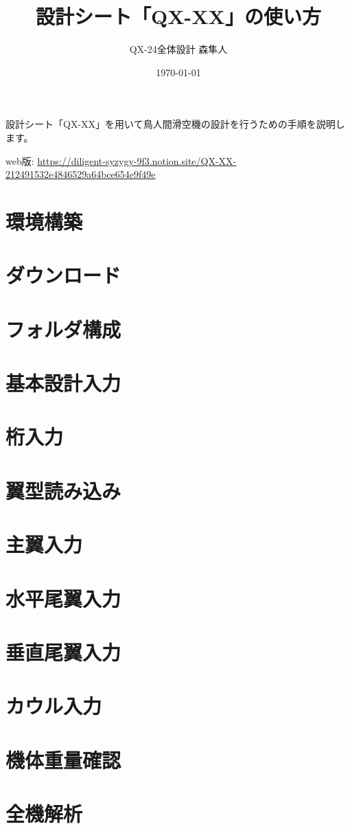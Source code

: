 \documentclass[a4paper,11pt,uplatex]{jsarticle}
\begin{document}
\title{設計シート「QX-XX」の使い方}
\author{QX-24全体設計 森隼人}
\date{\today}
\maketitle

設計シート「QX-XX」を用いて鳥人間滑空機の設計を行うための手順を説明します。

web版: 
\url{https://diligent-syzygy-9f3.notion.site/QX-XX-212491532e4846529a64bce654e9f49e}

\tableofcontents

\section{環境構築}
\section{ダウンロード}
\section{フォルダ構成}
\section{基本設計入力}
\section{桁入力}
\section{翼型読み込み}
\section{主翼入力}
\section{水平尾翼入力}
\section{垂直尾翼入力}
\section{カウル入力}
\section{機体重量確認}
\section{全機解析}
\end{document}
